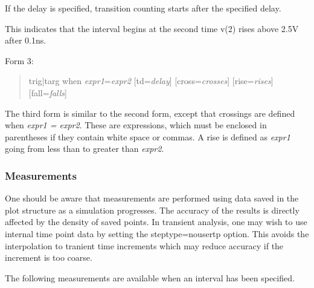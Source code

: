 If the delay is specified, transition counting starts after the
specified delay.


This indicates that the interval begins at the second time {\vt v(2)} rises
above 2.5V after 0.1ns.

Form 3:
\begin{quote}\vt
    trig|targ when {\it expr1\/}={\it expr2} [td={\it delay}]
        [cross={\it crosses}] [rise={\it rises}] [fall={\it falls}]
\end{quote}

The third form is similar to the second form, except that crossings
are defined when {\it expr1 = expr2}.  These are expressions, which
must be enclosed in parentheses if they contain white space or commas. 
A rise is defined as {\it expr1} going from less than to greater than
{\it expr2}.

\subsubsection{Measurements}

One should be aware that measurements are performed using data saved
in the plot structure as a simulation progresses.  The accuracy of the
results is directly affected by the density of saved points.  In
transient analysis, one may wish to use internal time point data by
setting the {\vt steptype=nousertp} option.  This avoids the
interpolation to tranient time increments which may reduce accuracy if
the increment is too coarse.

The following measurements are available when an interval has been
specified.


